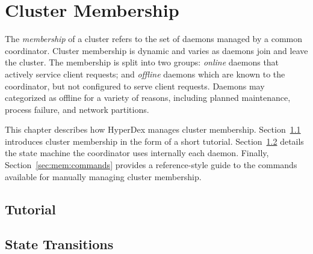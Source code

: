 \chapter{Cluster Membership}
\label{sec:cluster-membership}

The {\em membership} of a cluster refers to the set of daemons managed by a
common coordinator.  Cluster membership is dynamic and varies as daemons join
and leave the cluster.  The membership is split into two groups: {\em online}
daemons that actively service client requests; and {\em offline} daemons which
are known to the coordinator, but not configured to serve client requests.
Daemons may categorized as offline for a variety of reasons, including planned
maintenance, process failure, and network partitions.

This chapter describes how HyperDex manages cluster membership.
Section~\ref{sec:mem:tutorial} introduces cluster membership in the form of a
short tutorial.
Section~\ref{sec:mem:state-trans} details the state machine the coordinator uses
internally each daemon.
Finally, Section~\ref{sec:mem:commands} provides a reference-style guide to the
commands available for manually managing cluster membership.

\section{Tutorial}
\label{sec:mem:tutorial}

\section{State Transitions}
\label{sec:mem:state-trans}

